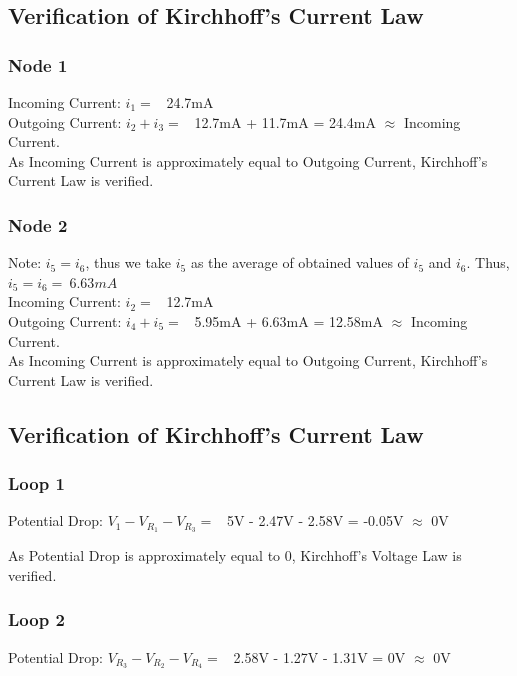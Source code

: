 \documentclass{article}
\begin{document}
\newpage

\subsection{Verification of Kirchhoff's Current Law}
\vspace{5px}
\subsubsection{Node 1}
Incoming Current: $i_1=$ \ 24.7mA \\
Outgoing Current: $i_2 + i_3=$ \ 12.7mA + 11.7mA = 24.4mA $\approx$ Incoming Current. \\
\noindent
As Incoming Current is approximately equal to Outgoing Current, Kirchhoff's Current Law is verified.

\subsubsection{Node 2}
Note: $i_5=i_6$, thus we take $i_5$ as the average of obtained values of $i_5$ and $i_6$. Thus, $i_5=i_6= \ 6.63mA$ \\

\noindent
Incoming Current: $i_2=$ \ 12.7mA \\
Outgoing Current: $i_4 + i_5=$ \ 5.95mA + 6.63mA = 12.58mA $\approx$ Incoming Current. \\ 
\noindent
As Incoming Current is approximately equal to Outgoing Current, Kirchhoff's Current Law is verified.

\subsection{Verification of Kirchhoff's Current Law}
\vspace{5px}
\subsubsection{Loop 1}
Potential Drop: $V_1-V_{R_1}-V_{R_3}=$ \ 5V - 2.47V - 2.58V = -0.05V $\approx$ 0V

\noindent
As Potential Drop is approximately equal to 0, Kirchhoff's Voltage Law is verified.

\subsubsection{Loop 2}
Potential Drop: $V_{R_3}-V_{R_2}-V_{R_4}=$ \ 2.58V - 1.27V - 1.31V = 0V $\approx$ 0V
\end{document}
